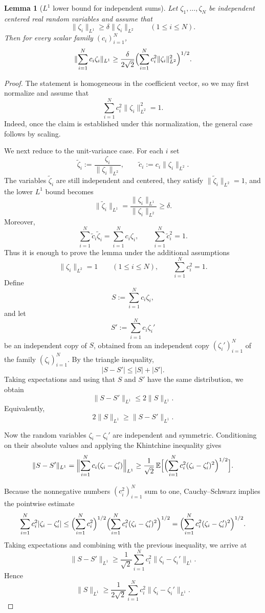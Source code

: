 \documentclass[11pt]{amsart}
\numberwithin{equation}{section}
\newtheorem{lemma}[theorem]{Lemma}
\theoremstyle{definition}
\theoremstyle{remark}
\newcommand{\E}{\mathbb E}
\newcommand{\abs}[1]{\lvert #1 \rvert}
\newcommand{\norm}[1]{\lVert #1 \rVert}
\begin{document}
\begin{lemma}[$L^1$ lower bound for independent sums]\label{lem:l1lower}
Let $\zeta_1,\dots,\zeta_N$ be independent centered real random variables and
assume that
\[
\norm{\zeta_i}_{L^1}\ge \delta \norm{\zeta_i}_{L^2}
\qquad(1\le i\le N).
\]
Then for every scalar family $(c_i)_{i=1}^N$,
\[
\norm{\sum_{i=1}^N c_i\zeta_i}_{L^1}
\ge
\frac{\delta}{2\sqrt2}
\Bigl(\sum_{i=1}^N c_i^2\norm{\zeta_i}_{L^2}^2\Bigr)^{1/2}.
\]
\end{lemma}

\begin{proof}
The statement is homogeneous in the coefficient vector, so we may first
normalize and assume that
\[
\sum_{i=1}^N c_i^2\norm{\zeta_i}_{L^2}^2=1.
\]
Indeed, once the claim is established under this normalization, the general
case follows by scaling.

We next reduce to the unit-variance case.  For each $i$ set
\[
\widetilde\zeta_i:=\frac{\zeta_i}{\norm{\zeta_i}_{L^2}},
\qquad
\widetilde c_i:=c_i\norm{\zeta_i}_{L^2}.
\]
The variables $\widetilde\zeta_i$ are still independent and centered,
they satisfy $\norm{\widetilde\zeta_i}_{L^2}=1$, and the lower $L^1$ bound
becomes
\[
\norm{\widetilde\zeta_i}_{L^1}
=\frac{\norm{\zeta_i}_{L^1}}{\norm{\zeta_i}_{L^2}}
\ge \delta.
\]
Moreover,
\[
\sum_{i=1}^N \widetilde c_i \widetilde\zeta_i
=\sum_{i=1}^N c_i\zeta_i,
\qquad
\sum_{i=1}^N \widetilde c_i^2
=1.
\]
Thus it is enough to prove the lemma under the additional assumptions
\[
\norm{\zeta_i}_{L^2}=1
\qquad(1\le i\le N),
\qquad
\sum_{i=1}^N c_i^2=1.
\]
Define
\[
S:=\sum_{i=1}^N c_i\zeta_i,
\]
and let
\[
S':=\sum_{i=1}^N c_i\zeta_i'
\]
be an independent copy of $S$, obtained from an independent copy
$(\zeta_i')_{i=1}^N$ of the family $(\zeta_i)_{i=1}^N$.
By the triangle inequality,
\[
\abs{S-S'}\le \abs{S}+\abs{S'}.
\]
Taking expectations and using that $S$ and $S'$ have the same distribution, we
obtain
\[
\norm{S-S'}_{L^1}\le 2\norm{S}_{L^1}.
\]
Equivalently,
\[
2\norm{S}_{L^1}\ge \norm{S-S'}_{L^1}.
\]

Now the random variables $\zeta_i-\zeta_i'$ are independent and symmetric.
Conditioning on their absolute values and applying the Khintchine inequality
gives
\[
\norm{S-S'}_{L^1}
=
\Bigl\|\sum_{i=1}^N c_i(\zeta_i-\zeta_i')\Bigr\|_{L^1}
\ge
\frac{1}{\sqrt2}\,
\E\Bigl[\Bigl(\sum_{i=1}^N c_i^2(\zeta_i-\zeta_i')^2\Bigr)^{1/2}\Bigr].
\]

Because the nonnegative numbers $(c_i^2)_{i=1}^N$ sum to one, Cauchy--Schwarz
implies the pointwise estimate
\[
\sum_{i=1}^N c_i^2\abs{\zeta_i-\zeta_i'}
\le
\Bigl(\sum_{i=1}^N c_i^2\Bigr)^{1/2}
\Bigl(\sum_{i=1}^N c_i^2(\zeta_i-\zeta_i')^2\Bigr)^{1/2}
=
\Bigl(\sum_{i=1}^N c_i^2(\zeta_i-\zeta_i')^2\Bigr)^{1/2}.
\]
Taking expectations and combining with the previous inequality, we arrive at
\[
\norm{S-S'}_{L^1}
\ge
\frac{1}{\sqrt2}\sum_{i=1}^N c_i^2\norm{\zeta_i-\zeta_i'}_{L^1}.
\]
Hence
\[
\norm{S}_{L^1}
\ge
\frac{1}{2\sqrt2}\sum_{i=1}^N c_i^2\norm{\zeta_i-\zeta_i'}_{L^1}.
\]


\end{proof}
\end{document}
